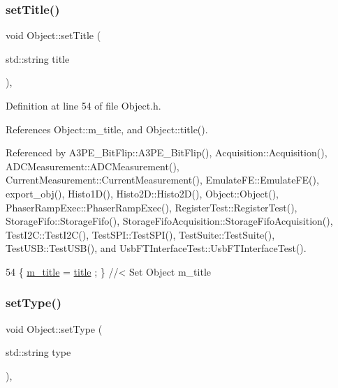 \subsubsection{\texorpdfstring{set\+Title()}{setTitle()}}
{\footnotesize\ttfamily void Object\+::set\+Title (\begin{DoxyParamCaption}\item[{std\+::string}]{title }\end{DoxyParamCaption})\hspace{0.3cm}{\ttfamily [inline]}, {\ttfamily [inherited]}}



Definition at line 54 of file Object.\+h.



References Object\+::m\+\_\+title, and Object\+::title().



Referenced by A3\+P\+E\+\_\+\+Bit\+Flip\+::\+A3\+P\+E\+\_\+\+Bit\+Flip(), Acquisition\+::\+Acquisition(), A\+D\+C\+Measurement\+::\+A\+D\+C\+Measurement(), Current\+Measurement\+::\+Current\+Measurement(), Emulate\+F\+E\+::\+Emulate\+F\+E(), export\+\_\+obj(), Histo1\+D(), Histo2\+D\+::\+Histo2\+D(), Object\+::\+Object(), Phaser\+Ramp\+Exec\+::\+Phaser\+Ramp\+Exec(), Register\+Test\+::\+Register\+Test(), Storage\+Fifo\+::\+Storage\+Fifo(), Storage\+Fifo\+Acquisition\+::\+Storage\+Fifo\+Acquisition(), Test\+I2\+C\+::\+Test\+I2\+C(), Test\+S\+P\+I\+::\+Test\+S\+P\+I(), Test\+Suite\+::\+Test\+Suite(), Test\+U\+S\+B\+::\+Test\+U\+S\+B(), and Usb\+F\+T\+Interface\+Test\+::\+Usb\+F\+T\+Interface\+Test().


\begin{DoxyCode}
54 \{ \hyperlink{classObject_affbeea1953eb5163573b92fad8f75727}{m\_title} = \hyperlink{classObject_a73a0f1a41828fdd8303dd662446fb6c3}{title} ; \} \textcolor{comment}{//< Set Object m\_title}
\end{DoxyCode}
\mbox{\label{classObject_aae534cc9d982bcb9b99fd505f2e103a5}} 
\subsubsection{\texorpdfstring{set\+Type()}{setType()}}
{\footnotesize\ttfamily void Object\+::set\+Type (\begin{DoxyParamCaption}\item[{std\+::string}]{type }\end{DoxyParamCaption})\hspace{0.3cm}{\ttfamily [inline]}, {\ttfamily [inherited]}}



